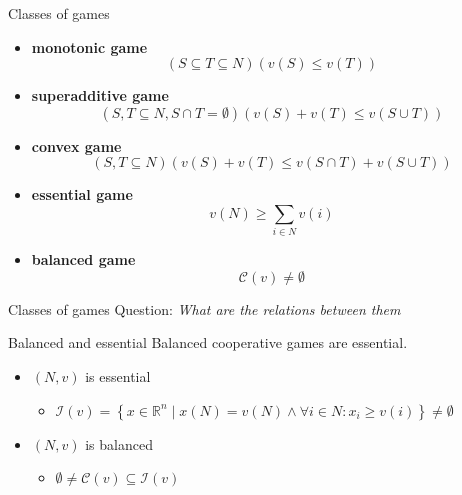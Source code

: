 \documentclass{beamer}
\newcommand{\R}{\mathbb{R}}
\begin{document}
\begin{frame}{Classes of games}
    \begin{itemize}
		\item \textbf{monotonic game} \[\left(S \subseteq T \subseteq N\right)\left(v(S) \leq v(T)\right)\]
		\item \textbf{superadditive game} \[\left(S,T \subseteq N, S \cap T = \emptyset\right)\left(v(S)+v(T) \leq v\left(S \cup T\right)\right)\]
		\item \textbf{convex game} \[\left(S,T \subseteq N\right)\left(v(S)+v(T) \leq v\left(S \cap T\right)+v\left(S \cup T\right)\right)\]
		\item \textbf{essential game} \[v(N) \geq \sum_{i \in N} v(i)\]
		\item \textbf{balanced game} \[\mathcal{C}(v) \neq \emptyset\]
	\end{itemize}
\end{frame}



\begin{frame}{Classes of games}
    Question: \textit{What are the relations between them}
	\begin{block}{Balanced and essential}
		Balanced cooperative games are essential.
	\end{block}
	\begin{itemize}
		\item $(N,v)$ is essential
		\begin{itemize}
			\item $\mathcal{I}(v)=\left\{x \in \R^n \mid x(N)=v(N)\land \forall i \in N: x_i \geq v(i)\right\} \neq \emptyset$
		\end{itemize}
		\item $(N,v)$ is balanced
		\begin{itemize}
			\item $\emptyset \neq \mathcal{C}(v) \subseteq \mathcal{I}(v)$
		\end{itemize}
	\end{itemize}
\end{frame}


\end{document}
